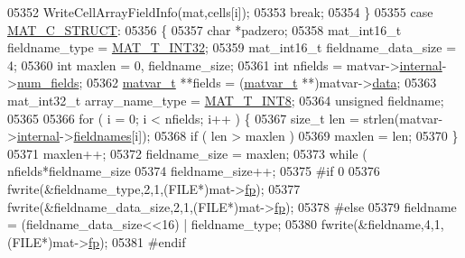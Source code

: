 \begin{DoxyCode}
{{{{{{{{{{{{{{{{{{{{{{{{{{{{{{{05352                     WriteCellArrayFieldInfo(mat,cells[i]);
05353                 \textcolor{keywordflow}{break};
05354             \}
05355             \textcolor{keywordflow}{case} \hyperlink{group___m_a_t_ggad4d60ae7b709fc81bfd744fb4c857c40acb467c7749c80902b798134c729bb521}{MAT\_C\_STRUCT}:
05356             \{
05357                 \textcolor{keywordtype}{char} *padzero;
05358                 mat\_int16\_t fieldname\_type = \hyperlink{group___m_a_t_ggacf7b3b879282b7ab3a51190e49bf3453a83e06a68320726c6572bfbb9f3addb1d}{MAT\_T\_INT32};
05359                 mat\_int16\_t fieldname\_data\_size = 4;
05360                 \textcolor{keywordtype}{int} maxlen = 0, fieldname\_size;
05361                 \textcolor{keywordtype}{int} nfields = matvar->\hyperlink{group___m_a_t_a6e97e3ed9f40c49322c18561c2a94e92}{internal}->\hyperlink{structmatvar__internal_a93fc447484f455eddf9334f2e9e411c2}{num\_fields};
05362                 \hyperlink{group___m_a_t_structmatvar__t}{matvar\_t} **fields = (\hyperlink{group___m_a_t_structmatvar__t}{matvar\_t} **)matvar->\hyperlink{group___m_a_t_a5672978efa230bbdecdf38ede781f7fa}{data};
05363                 mat\_int32\_t array\_name\_type = \hyperlink{group___m_a_t_ggacf7b3b879282b7ab3a51190e49bf3453a9807f5033ed4f9b548953742d9fd1658}{MAT\_T\_INT8};
05364                 \textcolor{keywordtype}{unsigned} fieldname;
05365 
05366                 for ( i = 0; i < nfields; i++ ) \{
05367                     \textcolor{keywordtype}{size\_t} len = strlen(matvar->\hyperlink{group___m_a_t_a6e97e3ed9f40c49322c18561c2a94e92}{internal}->\hyperlink{structmatvar__internal_a7574d000bfc98ad4860ae6590b8d4985}{fieldnames}[i]);
05368                     \textcolor{keywordflow}{if} ( len > maxlen )
05369                         maxlen = len;
05370                 \}
05371                 maxlen++;
05372                 fieldname\_size = maxlen;
05373                 \textcolor{keywordflow}{while} ( nfields*fieldname\_size %
05374                     fieldname\_size++;
05375 \textcolor{preprocessor}{#if 0}
05376                 fwrite(&fieldname\_type,2,1,(FILE*)mat->\hyperlink{struct__mat__t_a85f562e407ca9ad4d2a6e14f839432b7}{fp});
05377                 fwrite(&fieldname\_data\_size,2,1,(FILE*)mat->\hyperlink{struct__mat__t_a85f562e407ca9ad4d2a6e14f839432b7}{fp});
05378 \textcolor{preprocessor}{#else}
05379                 fieldname = (fieldname\_data\_size<<16) | fieldname\_type;
05380                 fwrite(&fieldname,4,1,(FILE*)mat->\hyperlink{struct__mat__t_a85f562e407ca9ad4d2a6e14f839432b7}{fp});
05381 \textcolor{preprocessor}{#endif}
}}}}}}}}}}}}}}}}}}}}}}}}}}}}}}}
\end{DoxyCode}

